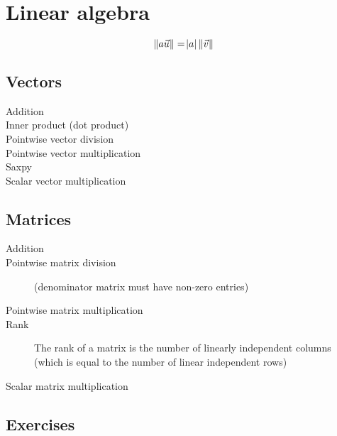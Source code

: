 \chapter{Linear algebra}





\[ 
\norm{a \vec{u}} = \abs{a} \, \norm{\vec{v}} 
\]

\section{Vectors}
\begin{description}
    \item[Addition]
    \item[Inner product (dot product)]
    \item[Pointwise vector division]
    \item[Pointwise vector multiplication]
    \item[Saxpy]
    \item[Scalar vector multiplication]
\end{description}

\section{Matrices}
\begin{description}
    \item[Addition]
    \item[Pointwise matrix division] (denominator matrix must have non-zero entries)
    \item[Pointwise matrix multiplication]
    \item[Rank] The rank of a matrix is the number of linearly independent columns (which is equal to the number of linear independent rows)
    \item[Scalar matrix multiplication]
\end{description}

\section{Exercises}
\begin{ExerciseList}
\end{ExerciseList}
